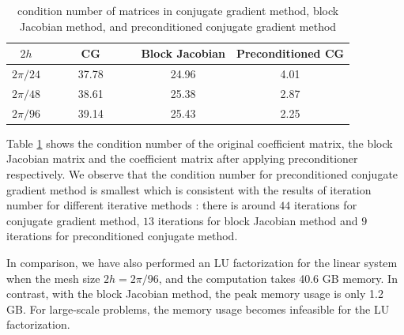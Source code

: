 \begin{table}[htbp]
	\begin{center}
		\begin{tabular}{|c|c c c|}
			\hline
			$2h$   & ~~~~ CG ~~~~& Block Jacobian & Preconditioned CG  \\
			\hline
			$2\pi/24$ &37.78& 24.96& 4.01\\
			\hline
			$2\pi/48$ &38.61 & 25.38 & 2.87\\
			\hline 
			$2\pi/96$ &39.14 &25.43 & 2.25\\
			\hline
		\end{tabular}
	\end{center}
	\caption{condition number of matrices in conjugate gradient method, block Jacobian method, and preconditioned conjugate gradient method}\label{condition_number}
\end{table} 
Table \ref{condition_number} shows the condition number of the original coefficient matrix, the block Jacobian matrix and the coefficient matrix after applying preconditioner respectively. We observe that the condition number for preconditioned conjugate gradient method is smallest which is consistent with the results of iteration number for different iterative methods : there is around $44$ iterations for conjugate gradient method, $13$ iterations for block Jacobian method and $9$ iterations for preconditioned conjugate method.

In comparison, we have also performed an LU factorization for the linear system when the mesh size $2h = 2\pi/96$, and the computation takes 40.6 GB memory. In contrast, with the block Jacobian method, the peak memory usage is only 1.2 GB. For large-scale problems, the memory usage becomes infeasible for the LU factorization. 


